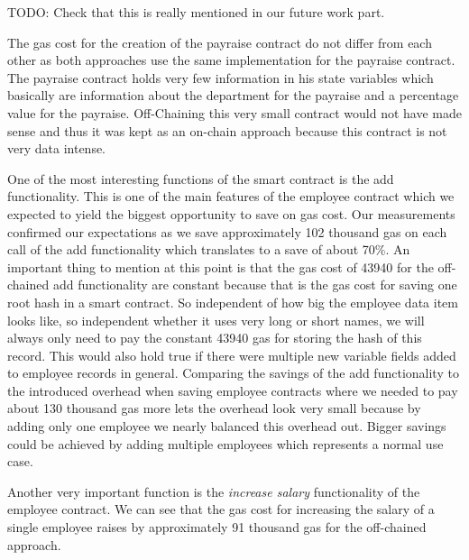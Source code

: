 TODO: Check that this is really mentioned in our future work part.

The gas cost for the creation of the payraise contract do not differ from each other as both approaches use the same implementation for the payraise contract. The payraise contract holds very few information in his state variables which basically are information about the department for the payraise and a percentage value for the payraise. Off-Chaining this very small contract would not have made sense and thus it was kept as an on-chain approach because this contract is not very data intense.

One of the most interesting functions of the smart contract is the add functionality. This is one of the main features of the employee contract which we expected to yield the biggest opportunity to save on gas cost. Our measurements confirmed our expectations as we save approximately 102 thousand gas on each call of the add functionality which translates to a save of about 70\%. An important thing to mention at this point is that the gas cost of 43940 for the off-chained add functionality are constant because that is the gas cost for saving one root hash in a smart contract. So independent of how big the employee data item looks like, so independent whether it uses very long or short names, we will always only need to pay the constant 43940 gas for storing the hash of this record. This would also hold true if there were multiple new variable fields added to employee records in general. Comparing the savings of the add functionality to the introduced overhead when saving employee contracts where we needed to pay about 130 thousand gas more lets the overhead look very small because by adding only one employee we nearly balanced this overhead out. Bigger savings could be achieved by adding multiple employees which represents a normal use case.

Another very important function is the \textit{increase salary} functionality of the employee contract. We can see that the gas cost for increasing the salary of a single employee raises by approximately 91 thousand gas for the off-chained approach.

